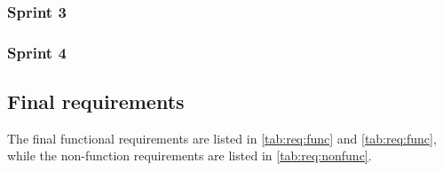 \subsubsection{Sprint 3}

\subsubsection{Sprint 4}

\subsection{Final requirements}
The final functional requirements are listed in \autoref{tab:req:func} and 
\autoref{tab:req:func}, while the non-function requirements are listed in
\autoref{tab:req:nonfunc}.

